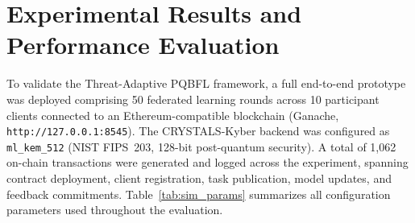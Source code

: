 \documentclass[journal, 10pt, twocolumn]{IEEEtran}
\begin{document}
\section{Experimental Results and Performance Evaluation}
To validate the Threat-Adaptive PQBFL framework, a full end-to-end prototype was deployed comprising 50 federated learning rounds across 10 participant clients connected to an Ethereum-compatible blockchain (Ganache, \texttt{http://127.0.0.1:8545}). The CRYSTALS-Kyber backend was configured as \texttt{ml\_kem\_512} (NIST FIPS~203, 128-bit post-quantum security). A total of 1,062 on-chain transactions were generated and logged across the experiment, spanning contract deployment, client registration, task publication, model updates, and feedback commitments. Table~\ref{tab:sim_params} summarizes all configuration parameters used throughout the evaluation.
\end{document}
